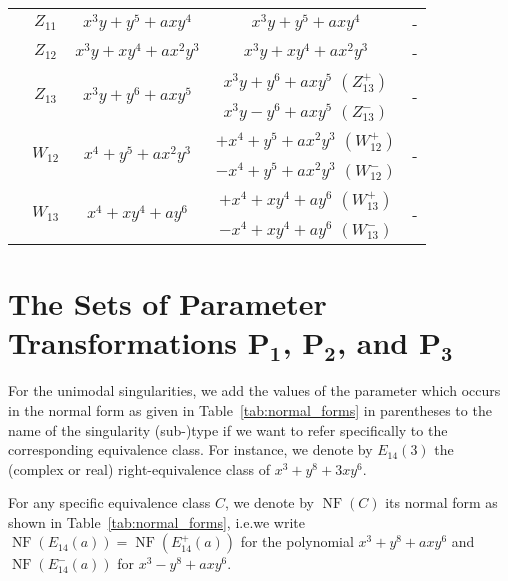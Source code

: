 \documentclass[noend]{amsproc}
\theoremstyle{definition}
\newcommand{\NF}[1]{\operatorname{NF}(#1)}
\begin{document}
\begin{table}[htbp]
\begin{tabular}{|c|c|c|c|c|}
& $Z_{11}$ & $x^3y+y^5+axy^4$ & $x^3y+y^5+axy^4$ & - \\ \cline{2-5}

& $Z_{12}$ & $x^3y+xy^4+ax^2y^3$ & $x^3y+xy^4+ax^2y^3$ & - \\ \cline{2-5}

& \multirow{2}{*}{$Z_{13}$} & \multirow{2}{*}{$x^3y+y^6+axy^5$}
  & $x^3y+y^6+axy^5$ $(Z_{13}^+)$ & \multirow{2}{*}{-} \\ \cline{4-4}
&&& $x^3y-y^6+axy^5$ $(Z_{13}^-)$ &                    \\ \cline{2-5}

& \multirow{2}{*}{$W_{12}$} & \multirow{2}{*}{$x^4+y^5+ax^2y^3$}
  & $+x^4+y^5+ax^2y^3$ $(W_{12}^+)$ & \multirow{2}{*}{-} \\ \cline{4-4}
&&& $-x^4+y^5+ax^2y^3$ $(W_{12}^-)$ &                    \\ \cline{2-5}

& \multirow{2}{*}{$W_{13}$} & \multirow{2}{*}{$x^4+xy^4+ay^6$}
  & $+x^4+xy^4+ay^6$ $(W_{13}^+)$ & \multirow{2}{*}{-} \\ \cline{4-4}
&&& $-x^4+xy^4+ay^6$ $(W_{13}^-)$ &                    \\ \hline

\end{tabular}
\end{table}
\section{The Sets of Parameter Transformations
$\boldsymbol{P_1}$, $\boldsymbol{P_2}$, and $\boldsymbol{P_3}$}

For the unimodal singularities, we add the values of the parameter which occurs
in the normal form as given in Table~\ref{tab:normal_forms} in parentheses to
the name of the singularity (sub-)type if we want to refer specifically to the
corresponding equivalence class. For instance, we denote by $E_{14}(3)$ the
(complex or real) right-equivalence class of $x^3+y^8+3xy^6$.

For any specific equivalence class $C$, we denote by $\NF{C}$ its normal form
as shown in Table~\ref{tab:normal_forms}, i.e.\@ we write
$\NF{E_{14}(a)} = \NF{E_{14}^+(a)}$ for the polynomial $x^3+y^8+axy^6$ and
$\NF{E_{14}^-(a)}$ for $x^3-y^8+axy^6$.
\end{document}
